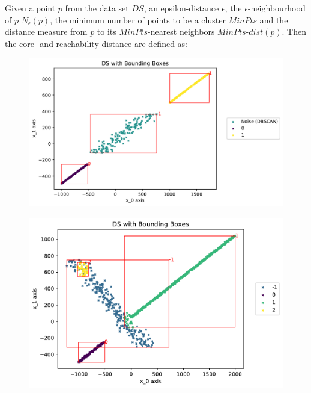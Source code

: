 Given a point $p$ from the data set $DS$, an epsilon-distance $\epsilon$, the  $\epsilon$-neighbourhood of $p$ $N_{\epsilon}(p)$, the minimum number of points to be a cluster $MinPts$ and the distance measure from $p$ to its $MinPts$-nearest neighbors $MinPts$-$dist(p)$. Then the core- and reachability-distance are defined as:
\begin{figure}
    \centering
    \begin{minipage}{.54\textwidth}
      \centering
      \includegraphics[width=.95\textwidth]{figures/DSwithDBSCANbadBoundingBoxes.pdf}
      \captionsetup{width=0.8\linewidth}
      \label{fig:baddbscan}
    \end{minipage}%
    \begin{minipage}{.46\textwidth}
      \centering
      \includegraphics[width=.95\textwidth]{figures/DSwithOPTICSBoundingBoxes.pdf}
      \captionsetup{width=0.9\linewidth}
      \label{fig:goodoptics}
    \end{minipage}
\end{figure}

